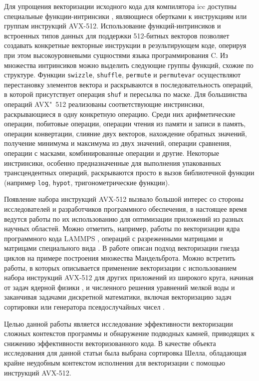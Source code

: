\documentclass[utf8]{psta}
\begin{document}
Для упрощения векторизации исходного кода для компилятора icc доступны специальные функции-интринсики \cite{compiler_guide, intrinsic_guide}, являющиеся обертками к инструкциям или группам инструкций AVX-512. 
Использование функций-интринсиков и встроенных типов данных для поддержки 512-битных векторов позволяет создавать конкретные векторные инструкции в результирующем коде, оперируя при этом высокоуровневыми сущностями языка программирования C. 
Из множества интринсиков можно выделить следующие группы функций, схожие по структуре. Функции \texttt{swizzle}, \texttt{shuffle}, \texttt{permute} и \texttt{permutevar} осуществляют перестановку элементов вектора и раскрываются в последовательность операций, в которой присутствует операция \texttt{shuf} и пересылка по маске. Для большинства операций AVX"~512 реализованы соответствующие инстринсики, раскрывающиеся в одну конкретную операцию. 
Среди них арифметические операции, побитовые операции, операции чтения из памяти и записи в память, операции конвертации, слияние двух векторов, нахождение обратных значений, получение минимума и максимума из двух значений, операции сравнения, операции с масками, комбинированные операции и другие. 
Некоторые инстринсики, особенно предназначенные для выполнения упакованных трансцендентных операций, раскрываются просто в вызов библиотечной функции (например \texttt{log}, \texttt{hypot}, тригонометрические функции).

Появление набора инструкций AVX-512 вызвало большой интерес со стороны исследователей и разработчиков программного обеспечения, в настоящее время ведутся работы по их использованию для оптимизации приложений из разных научных областей.
Можно отметить, например, работы по векторизации ядра программного кода LAMMPS \cite{McDoniel}, операций с разреженными матрицами \cite{Malas} и матрицами специального вида \cite{Benderskij}.
В работе \cite{Krzikalla} описан подход векторизации гнезда циклов на примере построения множества Мандельброта.
Можно встретить работы, в которых описывается применение векторизации с использованием набора инструкций AVX-512 для других приложений из широкого круга, начиная от задач ядерной физики \cite{Cook}, и численного решения уравнений мелкой воды \cite{Ferreira} и заканчивая задачами дискретной математики, включая векторизацию задач сортировки \cite{Bramas} или генератора псевдослучайных чисел \cite{Guskova}.

Целью данной работы является исследование эффективности векторизации сложных контекстов программы и обнаружение \glqq подводных камней\grqq , приводящих к снижению эффективности векторизованного кода. 
В качестве объекта исследования для данной статьи была выбрана сортировка Шелла, обладающая крайне неудобным контекстом исполнения для векторизации с помощью инструкций AVX-512.
\end{document}
